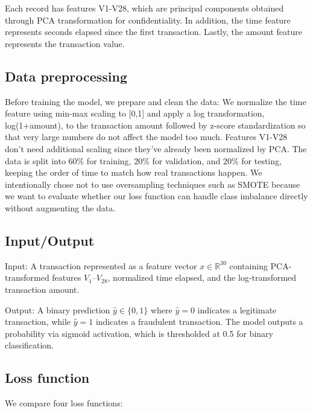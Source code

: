 \documentclass[10pt,twocolumn,letterpaper]{article}
\begin{document}
Each record has features V1-V28, which are principal components obtained through PCA transformation for confidentiality. In addition, the time feature represents seconds elapsed since the first transaction. Lastly, the amount feature represents the transaction value.

\subsection{Data preprocessing}

Before training the model, we prepare and clean the data: We normalize the time feature using min-max scaling to [0,1] and apply a log transformation, log(1+amount), to the transaction amount followed by z-score standardization so that very large numbers do not affect the model too much. Features V1-V28 don't need additional scaling since they've already been normalized by PCA.
The data is split into 60\% for training, 20\% for validation, and 20\% for testing, keeping the order of time to match how real transactions happen. We intentionally chose not to use oversampling techniques such as SMOTE because we want to evaluate whether our loss function can handle class imbalance directly without augmenting the data.


\subsection{Input/Output}

Input: A transaction represented as a feature vector $x \in \mathbb{R}^{30}$ containing PCA-transformed features $V_1$–$V_{28}$, normalized time elapsed, and the log-transformed transaction amount.

Output: A binary prediction $\hat{y} \in \{0,1\}$ where $\hat{y} = 0$ indicates a legitimate transaction, while $\hat{y} = 1$ indicates a fraudulent transaction. The model outputs a probability via sigmoid activation, which is thresholded at 0.5 for binary classification.

\subsection{Loss function}

We compare four loss functions:
\end{document}
